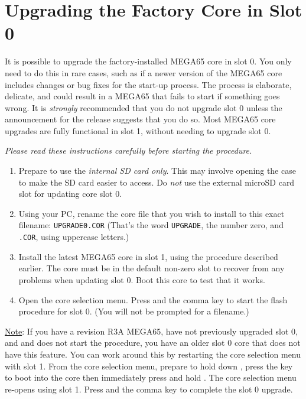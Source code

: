 \section{Upgrading the Factory Core in Slot 0}

It is possible to upgrade the factory-installed MEGA65 core in slot 0. You only need to do this in rare cases, such as if a newer version of the MEGA65 core includes changes or bug fixes for the start-up process. The process is elaborate, delicate, and could result in a MEGA65 that fails to start if something goes wrong. It is {\em strongly} recommended that you do not upgrade slot 0 unless the announcement for the release suggests that you do so. Most MEGA65 core upgrades are fully functional in slot 1, without needing to upgrade slot 0.

{\em Please read these instructions carefully before starting the procedure.}

\begin{enumerate}
  \item Prepare to use the {\em internal SD card only}. This may involve opening the case to make the SD card easier to access. Do {\em not} use the external microSD card slot for updating core slot 0.
  \item Using your PC, rename the core file that you wish to install to this exact filename: {\tt UPGRADE0.COR} (That's the word {\tt UPGRADE}, the number zero, and {\tt .COR}, using uppercase letters.)
  \item Install the latest MEGA65 core in slot 1, using the procedure described earlier. The core must be in the default non-zero slot to recover from any problems when updating slot 0. Boot this core to test that it works.
  \item Open the core selection menu. Press \megasymbolkey and the comma key to start the flash procedure for slot 0. (You will not be prompted for a filename.)
\end{enumerate}

\ifdefined\printmanual
\else
\underline{Note}: If you have a revision R3A MEGA65, have not previously upgraded slot 0, and \megasymbolkey and \megakey{,} does not start the procedure, you have an older slot 0 core that does not have this feature. You can work around this by restarting the core selection menu with slot 1. From the core selection menu, prepare to hold down , press the  key to boot into the core then immediately press and hold . The core selection menu re-opens using slot 1. Press \megasymbolkey and the comma key to complete the slot 0 upgrade.
\fi

